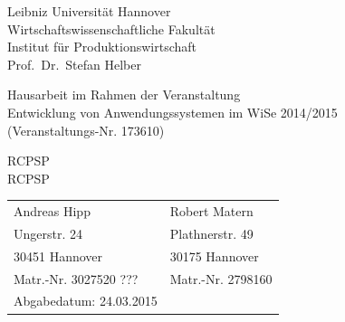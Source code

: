\documentclass[a4paper,12pt,parskip,bibtotoc,liststotoc]{article}
\begin{document}
%
%
\thispagestyle{empty}  %
Leibniz Universität Hannover\\
Wirtschaftswissenschaftliche Fakultät\\
Institut für Produktionswirtschaft\\
Prof.\ Dr.\ Stefan Helber

\vspace{5cm}

\begin{center}
Hausarbeit im Rahmen der Veranstaltung \\
Entwicklung von Anwendungssystemen  im WiSe 2014/2015 \\
(Veranstaltungs-Nr. 173610)

\vspace{2.5cm}

{\Large RCPSP \\
RCPSP}
\end{center}

\vspace{5.5cm}


\begin{table}[h!]
    \vspace*{-3mm}
    \hspace*{2mm}
  \renewcommand{\arraystretch}{1,5}
    \begin{tabular}{ll}
Andreas Hipp &Robert Matern \\
Ungerstr. 24&Plathnerstr. 49 \\
30451 Hannover&30175 Hannover \\
Matr.-Nr. 3027520 ???&Matr.-Nr. 2798160 \\[3mm]
Abgabedatum: 24.03.2015
	\end{tabular}
\end{table}

\newpage

\tableofcontents

\newpage  %

\listoffigures

\listoftables

\renewcommand\lstlistlistingname{Quellcodeverzeichnis} 
\lstlistoflistings 
\renewcommand*\lstlistingname{Quellcode} 
\end{document}
